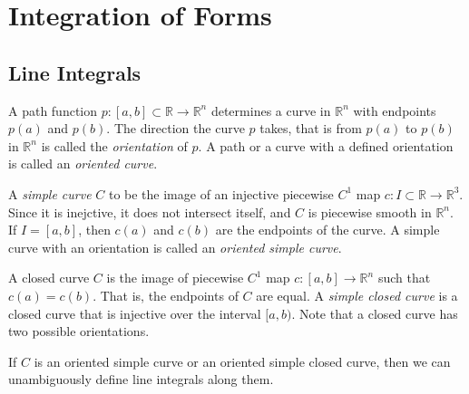 \section{Integration of Forms}

\subsection{Line Integrals}

  \begin{definition}
  A path function $p: [a,b]\subset \mathbb{R} \longrightarrow \mathbb{R}^n$ determines a curve in $\mathbb{R}^n$ with endpoints $p(a)$ and $p(b)$. The direction the curve $p$ takes, that is from $p(a)$ to $p(b)$ in $\mathbb{R}^n$ is called the \textit{orientation} of $p$. A path or a curve with a defined orientation is called an \textit{oriented curve}. 

  A \textit{simple curve} $C$ to be the image of an injective piecewise $C^1$ map $c: I \subset \mathbb{R} \longrightarrow \mathbb{R}^3$. Since it is inejctive, it does not intersect itself, and $C$ is piecewise smooth in $\mathbb{R}^n$. If $I = [a,b]$, then $c(a)$ and $c(b)$ are the endpoints of the curve. A simple curve with an orientation is called an \textit{oriented simple curve}. 

  A closed curve $C$ is the image of piecewise $C^1$ map $c: [a,b] \longrightarrow \mathbb{R}^n$ such that $c(a) = c(b)$. That is, the endpoints of $C$ are equal. A \textit{simple closed curve} is a closed curve that is injective over the interval $[a,b)$. Note that a closed curve has two possible orientations. 
  \end{definition}

  If $C$ is an oriented simple curve or an oriented simple closed curve, then we can unambiguously define line integrals along them. 

